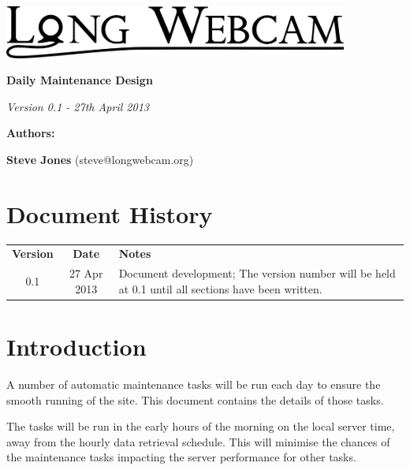 \documentclass[11pt]{article}
\begin{document}
\begin{titlepage}
\begin{center}

\includegraphics[width=0.85\textwidth]{./Logo_Large-cropped_black.png}

\vspace{3 cm}

\textbf{\Huge{Daily Maintenance Design}}

\vspace{1 cm}

\textit{\large{Version 0.1 - 27th April 2013}}

\vspace{4 cm}

\textbf{\Large{Authors:}}

\textbf{Steve Jones} (steve@longwebcam.org)

\end{center}

\end{titlepage}

\setcounter{tocdepth}{2}
\tableofcontents
\clearpage
{}
\section*{Document History}
\begin{table}[tbhp!]
\begin{tabular}{ c c p{4in} }
\textbf{Version} & \textbf{Date} & \textbf{Notes} \\
0.1 & 27 Apr 2013 & Document development; The version number will be held at 0.1 until all sections have been written. \\
\end{tabular}
\end{table}

\clearpage
{}

\section{Introduction}
A number of automatic maintenance tasks will be run each day to ensure the smooth running of the site. This document contains the details of those tasks.

The tasks will be run in the early hours of the morning on the local server time, away from the hourly data retrieval schedule. This will minimise the chances of the maintenance tasks impacting the server performance for other tasks. 
\end{document}

